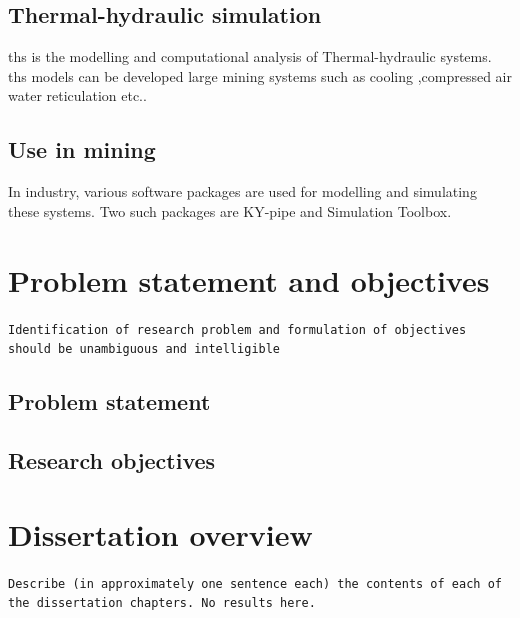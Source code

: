 \subsection{Thermal-hydraulic simulation}
\gls{ths} is the modelling and computational analysis of Thermal-hydraulic systems. \gls{ths} models can be developed large mining systems such as cooling ,compressed air water reticulation etc..\par

\subsection{Use in mining}
In industry, various software packages are used for modelling and simulating these systems. Two such packages are KY-pipe and Simulation Toolbox.

\section{Problem statement and objectives}
\texttt{Identification of research problem and formulation of objectives should be unambiguous and intelligible}
\subsection{Problem statement}
\subsection{Research objectives}
\section{Dissertation overview}
\texttt{Describe (in approximately one sentence each) the contents of each of the dissertation chapters. No results here.}